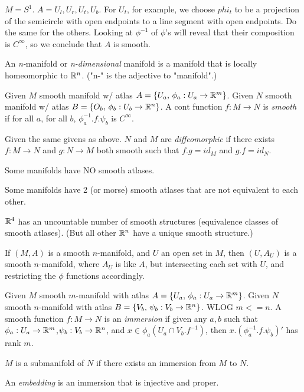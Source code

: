\documentclass[11pt,leqno,oneside]{amsart}
\begin{document}
\begin{example}
	$M = S^1$.  $A = {U_l, U_r, U_t, U_b}$.  For $U_t$, for example, we choose $phi_t$ to be a projection of the semicircle with open endpoints to a line segment with open endpoints.  Do the same for the others.  Looking at $\phi^{-1}$ of $\phi$'s will reveal that their composition is $C^\infty$, so we conclude that $A$ is smooth.
\end{example}

\begin{defn}
	An \emph{n-}manifold or \emph{n-dimensional} manifold is a manifold that is locally homeomorphic to ${\mathbb R}^n$.  ("n-" is the adjective to "manifold".)
\end{defn}


\begin{defn}
	Given $M$ smooth manifold w/ atlas $A = \{ U_a, \,  \phi_a : U_a \to {\mathbb R}^m \}$.
	Given $N$ smooth manifold w/ atlas $B = \{ O_b, \,  \phi_b : U_b \to {\mathbb R}^n \}$.
	A cont function $f : M \to N$ is \emph{smooth} if for all $a$, for all $b$, $\phi_a^{-1}.f.\psi_b$ is $C^\infty$.
\end{defn}
\begin{defn}
	Given the same givens as above.
	$N$ and $M$ are \emph{diffeomorphic} if there exists $f : M \to N$ and $g : N \to M$ both smooth such that $f.g = id_M$ and $g.f = id_N$.
\end{defn}

\begin{rmk}
	Some manifolds have NO smooth atlases.

	Some manifolds have 2 (or morse) smooth atlases that are not equivalent to each other.
\end{rmk}


\begin{thm}
	${\mathbb R}^4$ has an uncountable number of smooth structures (equivalence classes of smooth atlases).  (But all other ${\mathbb R}^n$ have a unique smooth structure.)
\end{thm}

\begin{rmk}
	If $(M,A)$ is a smooth $n$-manifold, and $U$ an open set in $M$, then $(U,A_U)$ is a smooth $n$-manifold, where $A_U$ is like $A$, but intersecting each set with $U$, and restricting the $\phi$ functions accordingly.
\end{rmk}

\begin{defn}
	Given $M$ smooth $m$-manifold with atlas $A = \{ U_a, \,\phi_a : U_a \to {\mathbb R}^m \}$.
	Given $N$ smooth $n$-manifold with atlas $B = \{ V_b, \,\psi_b : V_b \to {\mathbb R}^n \}$.
	WLOG $m <=n$.
	A smooth function $f : M \to N$  is an \emph{immersion} if given any $a, b$ such that $\phi_a: U_a \to {\mathbb R}^m$,$\psi_b: V_b \to {\mathbb R}^n$, and $x \in \phi_a(U_a \cap V_b.f^{-1})$, then $x.(\phi_a^{-1}.f.\psi_b)'$ has rank $m$.
\end{defn}

\begin{defn}
	$M$ is a submanifold of $N$ if there exists an immersion from $M$ to $N$.
\end{defn}

\begin{defn}
	An \emph{embedding} is an immersion that is injective and proper.
\end{defn}
\end{document}

